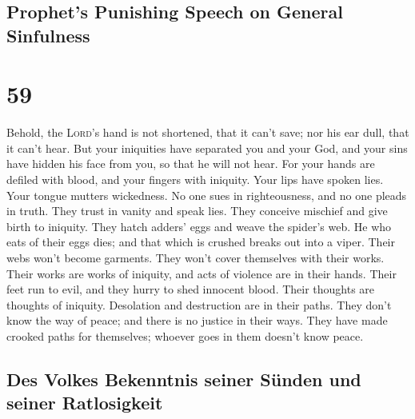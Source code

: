 \hypertarget{prophets-punishing-speech-on-general-sinfulness}{%
\subsection{Prophet's Punishing Speech on General
Sinfulness}\label{prophets-punishing-speech-on-general-sinfulness}}

\hypertarget{section-58}{%
\section{59}\label{section-58}}

 Behold, the \textsc{Lord}'s hand is not shortened, that
it can't save; nor his ear dull, that it can't hear.  But
your iniquities have separated you and your God, and your sins have
hidden his face from you, so that he will not hear.  For
your hands are defiled with blood, and your fingers with iniquity. Your
lips have spoken lies. Your tongue mutters wickedness.  No
one sues in righteousness, and no one pleads in truth. They trust in
vanity and speak lies. They conceive mischief and give birth to
iniquity.  They hatch adders' eggs and weave the spider's
web. He who eats of their eggs dies; and that which is crushed breaks
out into a viper.  Their webs won't become garments. They
won't cover themselves with their works. Their works are works of
iniquity, and acts of violence are in their hands.  Their
feet run to evil, and they hurry to shed innocent blood. Their thoughts
are thoughts of iniquity. Desolation and destruction are in their paths.
 They don't know the way of peace; and there is no justice
in their ways. They have made crooked paths for themselves; whoever goes
in them doesn't know peace.

\hypertarget{des-volkes-bekenntnis-seiner-suxfcnden-und-seiner-ratlosigkeit}{%
\subsection{Des Volkes Bekenntnis seiner Sünden und seiner
Ratlosigkeit}\label{des-volkes-bekenntnis-seiner-suxfcnden-und-seiner-ratlosigkeit}}

